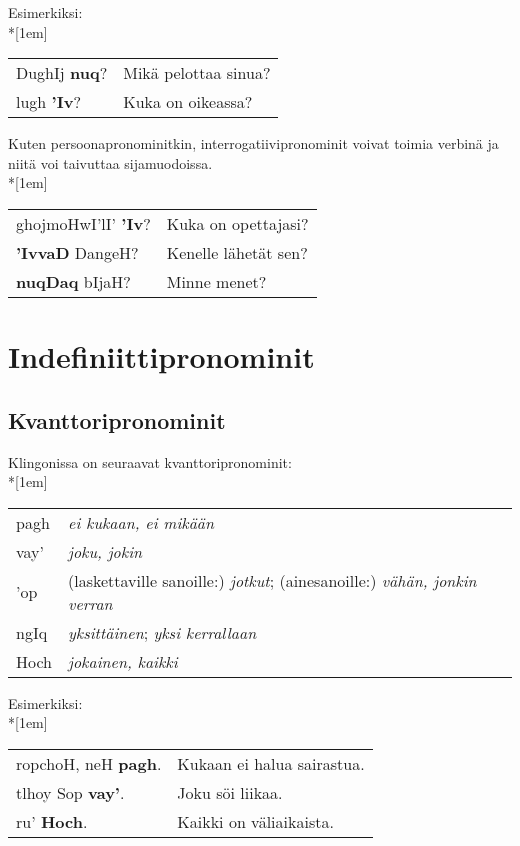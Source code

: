 \documentclass{book}
\begin{document}
Esimerkiksi:\\*[1em]
\begin{tabular}{l l}
    DughIj \textbf{nuq}? & Mikä pelottaa sinua? \\
    lugh \textbf{'Iv}? & Kuka on oikeassa? \\
\end{tabular}

Kuten persoonapronominitkin, interrogatiivipronominit voivat toimia verbinä ja niitä voi taivuttaa sijamuodoissa.\\*[1em]
\begin{tabular}{l l}
    ghojmoHwI'lI' \textbf{'Iv}? & Kuka on opettajasi? \\
    \textbf{'IvvaD} DangeH? & Kenelle lähetät sen? \\
    \textbf{nuqDaq} bIjaH? & Minne menet? \\
\end{tabular}

\section{Indefiniittipronominit}

\subsection{Kvanttoripronominit}

Klingonissa on seuraavat kvanttoripronominit:\\*[1em]
\begin{tabular}{Bl l}
    pagh & \textit{ei kukaan, ei mikään} \\
    vay' & \textit{joku, jokin} \\
    'op & (laskettaville sanoille:) \textit{jotkut}; (ainesanoille:) \textit{vähän, jonkin verran} \\
    ngIq & \textit{yksittäinen}; \textit{yksi kerrallaan} \\
    Hoch & \textit{jokainen, kaikki} \\
\end{tabular}

Esimerkiksi:\\*[1em]
\begin{tabular}{l l}
    ropchoH, neH \textbf{pagh}. & Kukaan ei halua sairastua. \\
    tlhoy Sop \textbf{vay'}. & Joku söi liikaa. \\
    ru' \textbf{Hoch}. & Kaikki on väliaikaista. \\
\end{tabular}
\end{document}
